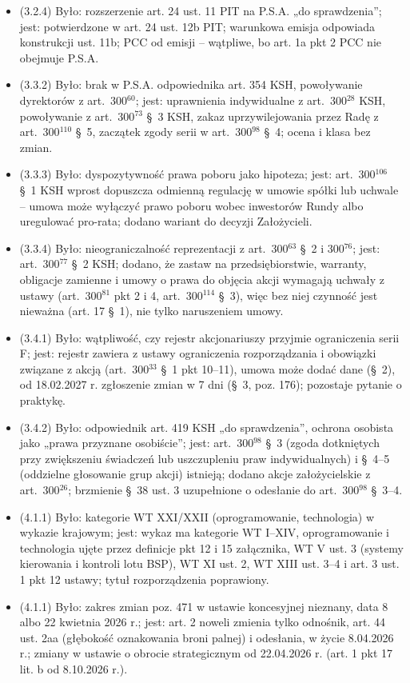 \documentclass[12pt,a4paper]{report}
\begin{document}
\begin{itemize}
  \item (3.2.4) Było: rozszerzenie art. 24 ust. 11 PIT na P.S.A. „do sprawdzenia”; jest: potwierdzone w art. 24 ust. 12b PIT; warunkowa emisja odpowiada konstrukcji ust. 11b; PCC od emisji – wątpliwe, bo art. 1a pkt 2 PCC nie obejmuje P.S.A.
  \item (3.3.2) Było: brak w P.S.A. odpowiednika art. 354 KSH, powoływanie dyrektorów z art.~300$^{60}$; jest: uprawnienia indywidualne z art.~300$^{28}$ KSH, powoływanie z art.~300$^{73}$ §~3 KSH, zakaz uprzywilejowania przez Radę z art.~300$^{110}$ §~5, zaczątek zgody serii w art.~300$^{98}$ §~4; ocena i klasa bez zmian.
  \item (3.3.3) Było: dyspozytywność prawa poboru jako hipoteza; jest: art.~300$^{106}$ §~1 KSH wprost dopuszcza odmienną regulację w umowie spółki lub uchwale – umowa może wyłączyć prawo poboru wobec inwestorów Rundy albo uregulować pro-rata; dodano wariant do decyzji Założycieli.
  \item (3.3.4) Było: nieograniczalność reprezentacji z art.~300$^{63}$ §~2 i 300$^{76}$; jest: art.~300$^{77}$ §~2 KSH; dodano, że zastaw na przedsiębiorstwie, warranty, obligacje zamienne i umowy o prawa do objęcia akcji wymagają uchwały z ustawy (art.~300$^{81}$ pkt 2 i 4, art.~300$^{114}$ §~3), więc bez niej czynność jest nieważna (art. 17 §~1), nie tylko naruszeniem umowy.
  \item (3.4.1) Było: wątpliwość, czy rejestr akcjonariuszy przyjmie ograniczenia serii F; jest: rejestr zawiera z ustawy ograniczenia rozporządzania i obowiązki związane z akcją (art.~300$^{33}$ §~1 pkt 10–11), umowa może dodać dane (§~2), od 18.02.2027 r. zgłoszenie zmian w 7 dni (§~3, poz. 176); pozostaje pytanie o praktykę.
  \item (3.4.2) Było: odpowiednik art. 419 KSH „do sprawdzenia”, ochrona osobista jako „prawa przyznane osobiście”; jest: art.~300$^{98}$ §~3 (zgoda dotkniętych przy zwiększeniu świadczeń lub uszczupleniu praw indywidualnych) i §~4–5 (oddzielne głosowanie grup akcji) istnieją; dodano akcje założycielskie z art.~300$^{26}$; brzmienie §~38 ust. 3 uzupełnione o odesłanie do art.~300$^{98}$ §~3–4.
  \item (4.1.1) Było: kategorie WT XXI/XXII (oprogramowanie, technologia) w wykazie krajowym; jest: wykaz ma kategorie WT I--XIV, oprogramowanie i technologia ujęte przez definicje pkt 12 i 15 załącznika, WT V ust. 3 (systemy kierowania i kontroli lotu BSP), WT XI ust. 2, WT XIII ust. 3--4 i art. 3 ust. 1 pkt 12 ustawy; tytuł rozporządzenia poprawiony.
  \item (4.1.1) Było: zakres zmian poz. 471 w ustawie koncesyjnej nieznany, data 8 albo 22 kwietnia 2026 r.; jest: art. 2 noweli zmienia tylko odnośnik, art. 44 ust. 2aa (głębokość oznakowania broni palnej) i odesłania, w życie 8.04.2026 r.; zmiany w ustawie o obrocie strategicznym od 22.04.2026 r. (art. 1 pkt 17 lit. b od 8.10.2026 r.).

\end{itemize}
\end{document}
